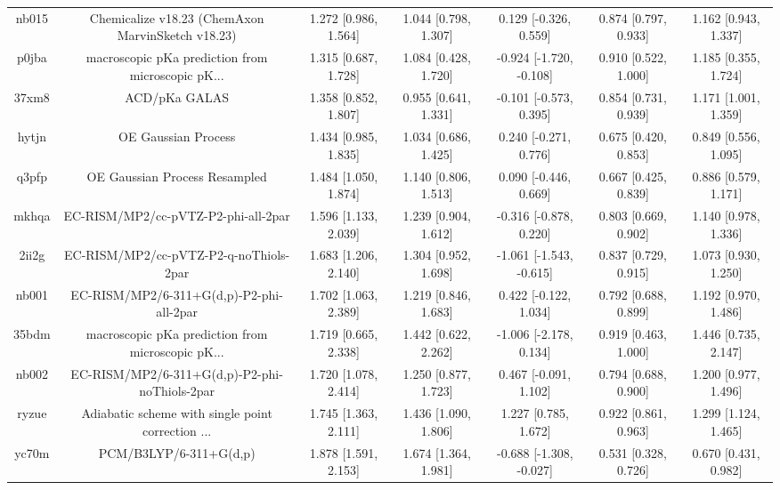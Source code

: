 \documentclass{article}
\begin{document}
\begin{center}
\begin{longtable}{|ccccccc|}
 nb015 &  Chemicalize v18.23 (ChemAxon MarvinSketch v18.23) &  1.272 [0.986, 1.564] &  1.044 [0.798, 1.307] &    0.129 [-0.326, 0.559] &  0.874 [0.797, 0.933] &   1.162 [0.943, 1.337] \\
 p0jba &  macroscopic pKa prediction from microscopic pK... &  1.315 [0.687, 1.728] &  1.084 [0.428, 1.720] &  -0.924 [-1.720, -0.108] &  0.910 [0.522, 1.000] &   1.185 [0.355, 1.724] \\
 37xm8 &                                      ACD/pKa GALAS &  1.358 [0.852, 1.807] &  0.955 [0.641, 1.331] &   -0.101 [-0.573, 0.395] &  0.854 [0.731, 0.939] &   1.171 [1.001, 1.359] \\
 hytjn &                                OE Gaussian Process &  1.434 [0.985, 1.835] &  1.034 [0.686, 1.425] &    0.240 [-0.271, 0.776] &  0.675 [0.420, 0.853] &   0.849 [0.556, 1.095] \\
 q3pfp &                      OE Gaussian Process Resampled &  1.484 [1.050, 1.874] &  1.140 [0.806, 1.513] &    0.090 [-0.446, 0.669] &  0.667 [0.425, 0.839] &   0.886 [0.579, 1.171] \\
 mkhqa &                EC-RISM/MP2/cc-pVTZ-P2-phi-all-2par &  1.596 [1.133, 2.039] &  1.239 [0.904, 1.612] &   -0.316 [-0.878, 0.220] &  0.803 [0.669, 0.902] &   1.140 [0.978, 1.336] \\
 2ii2g &             EC-RISM/MP2/cc-pVTZ-P2-q-noThiols-2par &  1.683 [1.206, 2.140] &  1.304 [0.952, 1.698] &  -1.061 [-1.543, -0.615] &  0.837 [0.729, 0.915] &   1.073 [0.930, 1.250] \\
 nb001 &           EC-RISM/MP2/6-311+G(d,p)-P2-phi-all-2par &  1.702 [1.063, 2.389] &  1.219 [0.846, 1.683] &    0.422 [-0.122, 1.034] &  0.792 [0.688, 0.899] &   1.192 [0.970, 1.486] \\
 35bdm &  macroscopic pKa prediction from microscopic pK... &  1.719 [0.665, 2.338] &  1.442 [0.622, 2.262] &   -1.006 [-2.178, 0.134] &  0.919 [0.463, 1.000] &   1.446 [0.735, 2.147] \\
 nb002 &      EC-RISM/MP2/6-311+G(d,p)-P2-phi-noThiols-2par &  1.720 [1.078, 2.414] &  1.250 [0.877, 1.723] &    0.467 [-0.091, 1.102] &  0.794 [0.688, 0.900] &   1.200 [0.977, 1.496] \\
 ryzue &  Adiabatic scheme with single point correction ... &  1.745 [1.363, 2.111] &  1.436 [1.090, 1.806] &     1.227 [0.785, 1.672] &  0.922 [0.861, 0.963] &   1.299 [1.124, 1.465] \\
 yc70m &                             PCM/B3LYP/6-311+G(d,p) &  1.878 [1.591, 2.153] &  1.674 [1.364, 1.981] &  -0.688 [-1.308, -0.027] &  0.531 [0.328, 0.726] &   0.670 [0.431, 0.982] \\

\end{longtable}
\end{center}
\end{document}
